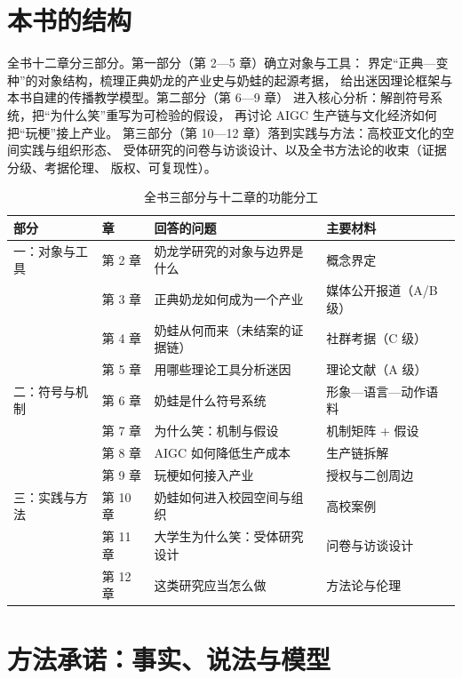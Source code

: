 \section{本书的结构}\label{sec:01:structure}

全书十二章分三部分。第一部分（第 2—5 章）确立对象与工具：
界定“正典—变种”的对象结构，梳理正典奶龙的产业史与奶蛙的起源考据，
给出迷因理论框架与本书自建的传播教学模型。第二部分（第 6—9 章）
进入核心分析：解剖符号系统，把“为什么笑”重写为可检验的假设，
再讨论 AIGC 生产链与文化经济如何把“玩梗”接上产业。
第三部分（第 10—12 章）落到实践与方法：高校亚文化的空间实践与组织形态、
受体研究的问卷与访谈设计、以及全书方法论的收束（证据分级、考据伦理、
版权、可复现性）。

\begin{table}[htbp]\centering
  \caption{全书三部分与十二章的功能分工}\label{tab:01:structure}
  \small
  \begin{tabularx}{\textwidth}{@{}llXX@{}}
    \toprule
    部分 & 章 & 回答的问题 & 主要材料 \\ \midrule
    一：对象与工具
      & 第 2 章 & 奶龙学研究的对象与边界是什么 & 概念界定 \\
      & 第 3 章 & 正典奶龙如何成为一个产业 & 媒体公开报道（A/B 级） \\
      & 第 4 章 & 奶蛙从何而来（未结案的证据链） & 社群考据（C 级） \\
      & 第 5 章 & 用哪些理论工具分析迷因 & 理论文献（A 级） \\ \midrule
    二：符号与机制
      & 第 6 章 & 奶蛙是什么符号系统 & 形象—语言—动作语料 \\
      & 第 7 章 & 为什么笑：机制与假设 & 机制矩阵 + 假设 \\
      & 第 8 章 & AIGC 如何降低生产成本 & 生产链拆解 \\
      & 第 9 章 & 玩梗如何接入产业 & 授权与二创周边 \\ \midrule
    三：实践与方法
      & 第 10 章 & 奶蛙如何进入校园空间与组织 & 高校案例 \\
      & 第 11 章 & 大学生为什么笑：受体研究设计 & 问卷与访谈设计 \\
      & 第 12 章 & 这类研究应当怎么做 & 方法论与伦理 \\ \bottomrule
  \end{tabularx}
\end{table}

\section{方法承诺：事实、说法与模型}\label{sec:01:method}


